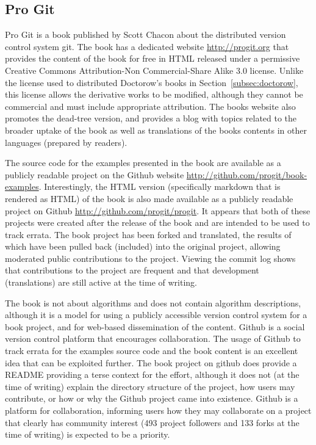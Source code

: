 \documentclass[a4paper, 11pt]{article}
\begin{document}
% 
% 
\subsection{Pro Git}
Pro Git is a book published by Scott Chacon \cite{Chacon2009} about the distributed version control system git. The book has a dedicated website \url{http://progit.org} that provides the content of the book for free in HTML released under a permissive Creative Commons Attribution-Non Commercial-Share Alike 3.0 license. Unlike the license used to distributed Doctorow's books in Section~\ref{subsec:doctorow}, this license allows the derivative works to be modified, although they cannot be commercial and must include appropriate attribution. The books website also promotes the dead-tree version, and provides a blog with topics related to the broader uptake of the book as well as translations of the books contents in other languages (prepared by readers).
 
The source code for the examples presented in the book are available as a publicly readable project on the Github website \url{http://github.com/progit/book-examples}. Interestingly, the HTML version (specifically markdown that is rendered as HTML) of the book is also made available as a publicly readable project on Github \url{http://github.com/progit/progit}. It appears that both of these projects were created after the release of the book and are intended to be used to track errata. The book project has been forked and translated, the results of which have been pulled back (included) into the original project, allowing moderated public contributions to the project. Viewing the commit log shows that contributions to the project are frequent and that development (translations) are still active at the time of writing.

The book is not about algorithms and does not contain algorithm descriptions, although it is a model for using a publicly accessible version control system for a book project, and for web-based dissemination of the content. Github is a social version control platform that encourages collaboration. The usage of Github to track errata for the examples source code and the book content is an excellent idea that can be exploited further. 
The book project on github does provide a README providing a terse context for the effort, although it does not (at the time of writing) explain the directory structure of the project, how users may contribute, or how or why the Github project came into existence. Github is a platform for collaboration, informing users how they may collaborate on a project that clearly has community interest (493 project followers and 133 forks at the time of writing) is expected to be a priority. 
\end{document}
